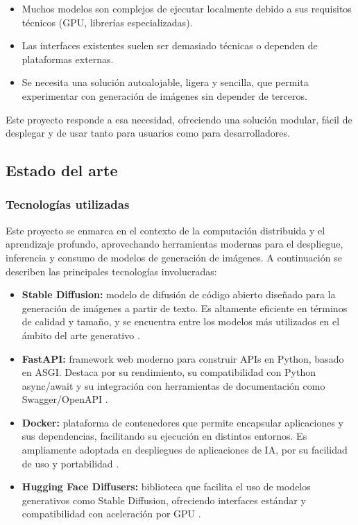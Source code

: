 \documentclass{article}
\begin{document}
\begin{itemize}
  \item Muchos modelos son complejos de ejecutar localmente debido a sus requisitos técnicos (GPU, librerías especializadas).

  \item Las interfaces existentes suelen ser demasiado técnicas o dependen de plataformas externas.

  \item Se necesita una solución autoalojable, ligera y sencilla, que permita experimentar con generación de imágenes sin depender de terceros.
\end{itemize}

Este proyecto responde a esa necesidad, ofreciendo una solución modular, fácil de desplegar y de usar tanto para usuarios como para desarrolladores.

\subsection{Estado del arte}

\subsubsection*{Tecnologías utilizadas}

Este proyecto se enmarca en el contexto de la computación distribuida y el aprendizaje profundo, aprovechando herramientas modernas para el despliegue, inferencia y consumo de modelos de generación de imágenes. A continuación se describen las principales tecnologías involucradas:
\begin{itemize}
  \item \textbf{Stable Diffusion:} modelo de difusión de código abierto diseñado para la generación de imágenes a partir de texto. Es altamente eficiente en términos de calidad y tamaño, y se encuentra entre los modelos más utilizados en el ámbito del arte generativo \cite{rombach2022high, stablediffusion21, vonPlaten2023diffusers}.

  \item \textbf{FastAPI:} framework web moderno para construir APIs en Python, basado en ASGI. Destaca por su rendimiento, su compatibilidad con Python async/await y su integración con herramientas de documentación como Swagger/OpenAPI \cite{ramirez2023fastapi, openapi2021}.

  \item \textbf{Docker:} plataforma de contenedores que permite encapsular aplicaciones y sus dependencias, facilitando su ejecución en distintos entornos. Es ampliamente adoptada en despliegues de aplicaciones de IA, por su facilidad de uso y portabilidad \cite{docker2023}.

  \item \textbf{Hugging Face Diffusers:} biblioteca que facilita el uso de modelos generativos como Stable Diffusion, ofreciendo interfaces estándar y compatibilidad con aceleración por GPU \cite{vonPlaten2023diffusers}.
\end{itemize}
\end{document}
